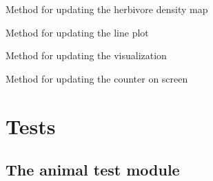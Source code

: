 \documentclass[a4paper,10pt,english]{sphinxmanual}
\begin{document}
\begin{fulllineitems}
\begin{fulllineitems}
\end{fulllineitems}


\begin{fulllineitems}
\label{\detokenize{simulation:biosim.simulation.BioSim.update_herbivore_density_map}}
Method for updating the herbivore density map

\end{fulllineitems}


\begin{fulllineitems}
\label{\detokenize{simulation:biosim.simulation.BioSim.update_line_plot}}
Method for updating the line plot

\end{fulllineitems}


\begin{fulllineitems}
\label{\detokenize{simulation:biosim.simulation.BioSim.update_visualization}}
Method for updating the visualization

\end{fulllineitems}


\begin{fulllineitems}
\label{\detokenize{simulation:biosim.simulation.BioSim.year_counter}}
Method for updating the counter on screen

\end{fulllineitems}


\end{fulllineitems}



\chapter{Tests}
\label{\detokenize{tests::doc}}\label{\detokenize{tests:tests}}

\section{The animal test module}
\label{\detokenize{tests:the-animal-test-module}}\label{\detokenize{tests:module-biosim.tests.test_animals}}
\end{document}
